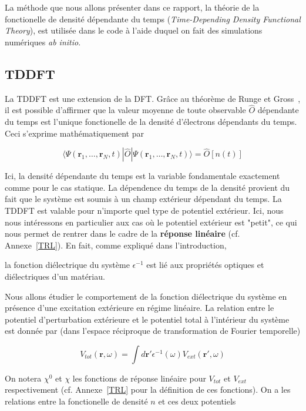 \documentclass[12pt, french]{report}
\theoremstyle{theoreme}
\begin{document}
La méthode que nous allons présenter dans ce rapport, la théorie de la fonctionelle de densité dépendante du temps (\textit{Time-Depending Density Functional Theory}), est utilisée dans le code à l'aide duquel on fait des simulations numériques \textit{ab initio}. 

\subsection{TDDFT}
La TDDFT est une extension de la DFT. Grâce au théorème de Runge et Gross~\cite{Run84}, il est possible d'affirmer que la valeur moyenne de toute observable $\hat{O}$ dépendante du temps est l'unique fonctionelle de la densité d'électrons dépendants du temps. Ceci s'exprime mathématiquement par

$$
\langle \Psi (\textbf{r}_1, \ldots, \textbf{r}_N, t) | \hat{O} | \Psi (\textbf{r}_1, \ldots, \textbf{r}_N, t) \rangle = \hat{O}[n(t)]
$$

Ici, la densité dépendante du temps est la variable fondamentale exactement comme pour le cas statique. La dépendence du temps de la densité provient du fait que le système est soumis à un champ extérieur dépendant du temps. La TDDFT est valable pour n'importe quel type de potentiel extérieur. Ici, nous nous intéressons en particulier aux cas où le potentiel extérieur est "petit", ce qui nous permet de rentrer dans le cadre de la \textbf{réponse linéaire} (cf. Annexe~\ref{TRL}). En fait, comme expliqué dans l'introduction, 


la fonction diélectrique du système $\epsilon^{-1}$ est lié aux propriétés optiques et diélectriques d'un matériau.

Nous allons étudier le comportement de la fonction diélectrique du système en présence d'une excitation extérieure en régime linéaire. La relation entre le potentiel d'perturbation extérieure et le potentiel total à l'intérieur du système est donnée par (dans l'espace réciproque de transformation de Fourier temporelle)

\begin{equation}\label{VtotVext}
V_{tot}(\textbf{r}, \omega) = \int d\textbf{r}' \epsilon^{-1}(\omega) V_{ext}(\textbf{r}', \omega)
\end{equation}

On notera $\chi^0$ et $\chi$ les fonctions de réponse linéaire pour $V_{tot}$ et $V_{ext}$ respectivement (cf. Annexe~\ref{TRL} pour la définition de ces fonctions). On a les relations entre la fonctionelle de densité $n$ et ces deux potentiels
\end{document}
